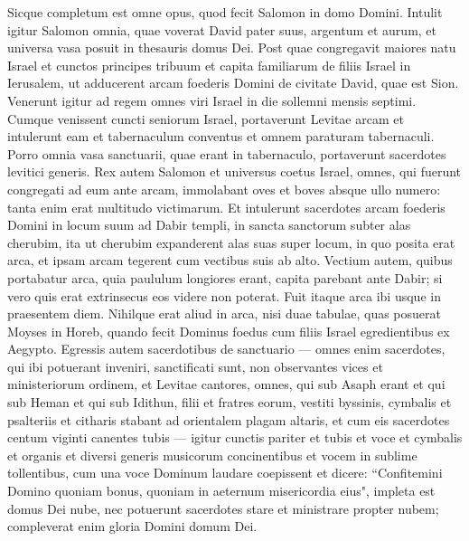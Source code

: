 \begin{biblechapter}  
\verse Sicque completum est omne opus, quod fecit Salomon in domo Domini. Intulit igitur Salomon omnia, quae voverat David pater suus, argentum et aurum, et universa vasa posuit in thesauris domus Dei. 
\verse Post quae congregavit maiores natu Israel et cunctos principes tribuum et capita familiarum de filiis Israel in Ierusalem, ut adducerent arcam foederis Domini de civitate David, quae est Sion. 
\verse Venerunt igitur ad regem omnes viri Israel in die sollemni mensis septimi. 
\verse Cumque venissent cuncti seniorum Israel, portaverunt Levitae arcam 
\verse et intulerunt eam et tabernaculum conventus et omnem paraturam tabernaculi. Porro omnia vasa sanctuarii, quae erant in tabernaculo, portaverunt sacerdotes levitici generis.  
\verse Rex autem Salomon et universus coetus Israel, omnes, qui fuerunt congregati ad eum ante arcam, immolabant oves et boves absque ullo numero: tanta enim erat multitudo victimarum. 
\verse Et intulerunt sacerdotes arcam foederis Domini in locum suum ad Dabir templi, in sancta sanctorum subter alas cherubim, 
\verse ita ut cherubim expanderent alas suas super locum, in quo posita erat arca, et ipsam arcam tegerent cum vectibus suis ab alto. 
\verse Vectium autem, quibus portabatur arca, quia paululum longiores erant, capita parebant ante Dabir; si vero quis erat extrinsecus eos videre non poterat. Fuit itaque arca ibi usque in praesentem diem. 
\verse Nihilque erat aliud in arca, nisi duae tabulae, quas posuerat Moyses in Horeb, quando fecit Dominus foedus cum filiis Israel egredientibus ex Aegypto. 
\verse Egressis autem sacerdotibus de sanctuario — omnes enim sacerdotes, qui ibi potuerant inveniri, sanctificati sunt, non observantes vices et ministeriorum ordinem, 
\verse et Levitae cantores, omnes, qui sub Asaph erant et qui sub Heman et qui sub Idithun, filii et fratres eorum, vestiti byssinis, cymbalis et psalteriis et citharis stabant ad orientalem plagam altaris, et cum eis sacerdotes centum viginti canentes tubis — 
\verse igitur cunctis pariter et tubis et voce et cymbalis et organis et diversi generis musicorum concinentibus et vocem in sublime tollentibus, cum una voce Dominum laudare coepissent et dicere: “Confitemini Domino quoniam bonus, quoniam in aeternum misericordia eius", impleta est domus Dei nube, 
\verse nec potuerunt sacerdotes stare et ministrare propter nubem; compleverat enim gloria Domini domum Dei. 
\end{biblechapter}

